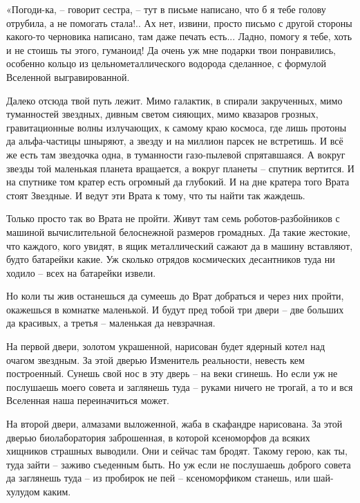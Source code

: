 \documentclass[ebook,oneside,final,openright]{memoir}
\begin{document}
\par
«Погоди-ка, – говорит сестра, – тут в письме написано, что б я тебе голову отрубила, а не помогать стала!.. Ах нет, извини, просто письмо с другой стороны какого-то черновика написано, там даже печать есть... Ладно, помогу я тебе, хоть и не стоишь ты этого, гуманоид! Да очень уж мне подарки твои понравились, особенно кольцо из цельнометаллического водорода сделанное, с формулой Вселенной выгравированной.\par
\par
Далеко отсюда твой путь лежит. Мимо галактик, в спирали закрученных, мимо туманностей звездных, дивным светом сияющих, мимо квазаров грозных, гравитационные волны излучающих, к самому краю космоса, где лишь протоны да альфа-частицы шныряют, а звезду и на миллион парсек не встретишь. И всё же есть там звездочка одна, в туманности газо-пылевой спрятавшаяся. А вокруг звезды той маленькая планета вращается, а вокруг планеты – спутник вертится. И на спутнике том кратер есть огромный да глубокий. И на дне кратера того Врата стоят Звездные. И ведут эти Врата к тому, что ты найти так жаждешь.\par
\par
Только просто так во Врата не пройти. Живут там семь роботов-разбойников с машиной вычислительной белоснежной размеров громадных. Да такие жестокие, что каждого, кого увидят, в ящик металлический сажают да в машину вставляют, будто батарейки какие. Уж сколько отрядов космических десантников туда ни ходило – всех на батарейки извели.\par
\par
Но коли ты жив останешься да сумеешь до Врат добраться и через них пройти, окажешься в комнатке маленькой. И будут пред тобой три двери – две больших да красивых, а третья – маленькая да невзрачная.\par
\par
На первой двери, золотом украшенной, нарисован будет ядерный котел над очагом звездным. За этой дверью Изменитель реальности, невесть кем построенный. Сунешь свой нос в эту дверь – на веки сгинешь. Но если уж не послушаешь моего совета и заглянешь туда – руками ничего не трогай, а то и вся Вселенная наша переиначиться может.\par
\par
На второй двери, алмазами выложенной, жаба в скафандре нарисована. За этой дверью биолаборатория заброшенная, в которой ксеноморфов да всяких хищников страшных выводили. Они и сейчас там бродят. Такому герою, как ты, туда зайти – заживо съеденным быть. Но уж если не послушаешь доброго совета да заглянешь туда – из пробирок не пей – ксеноморфиком станешь, или шай-хулудом каким.\par
\end{document}
